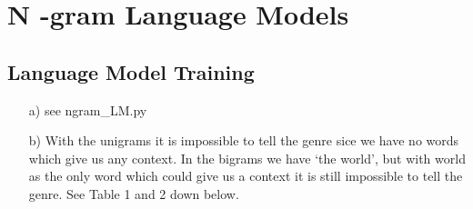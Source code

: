\documentclass{article}
\begin{document}
\section{N -gram Language Models}
\subsection{Language Model Training}
\begin{itemize}
	\item[a)] see ngram\_LM.py
	\item[b)]
	With the unigrams it is impossible to tell the genre sice we have no words which give us any context. In the bigrams we have `the world', but with world as the only word which could give us a context it is still impossible to tell the genre. See Table 1 and 2 down below.


\end{itemize}
\end{document}
